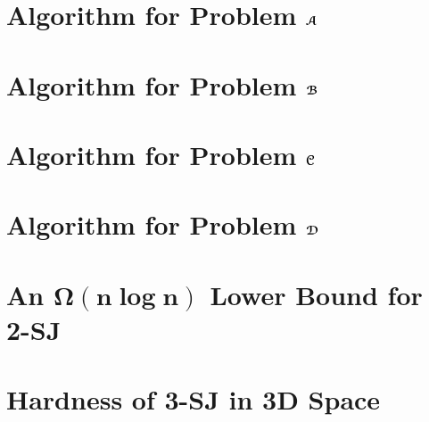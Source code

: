\documentclass[sigconf]{acmart}
\begin{document}



\balance

\appendix 

\section{Algorithm for Problem $\textrm{\boldmath${\EuScript{A}}$}$} \label{app:prob-a}

\section{Algorithm for Problem $\textrm{\boldmath${\EuScript{B}}$}$} \label{app:prob-b}

\section{Algorithm for Problem $\textrm{\boldmath${\EuScript{C}}$}$} \label{app:prob-c}

\section{Algorithm for Problem $\textrm{\boldmath${\EuScript{D}}$}$} \label{app:prob-d}

\section{An $\bm{\Omega(n \log n)}$ Lower Bound for 2-SJ} \label{app:lb}

\section{Hardness of 3-SJ in 3D Space} \label{app:lb-cond}

\end{document}
